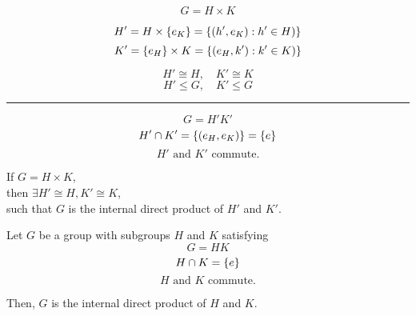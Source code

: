 
\begin{frame}{}
  \[
	G = H \times K
  \]

  \begin{definition}
	\[
	  H' = H \times \left\{e_{K}\right\} = \left\{(h', e_{K}): h' \in H)\right\}
	\]
	\[
	  K' = \left\{e_{H}\right\} \times K = \left\{(e_{H}, k'): k' \in K)\right\}
	\]
  \end{definition}

  \pause
  \[
	H' \cong H, \quad K' \cong K
  \]
  \pause \vspace{-0.50cm}
  \[
	H' \le G, \quad K' \le G
  \]

  \pause
  \vspace{-0.60cm}
  \begin{center}
	\rule{8cm}{0.6pt}
  \end{center}
  \vspace{-0.60cm}

  \[
	G = H'K'
  \]
  \pause \vspace{-0.50cm}
  \[
	H' \cap K' = \left\{(e_{H}, e_{K})\right\} = \left\{e\right\}
  \]
  \pause \vspace{-0.50cm}
  \[
	H' \text{ and } K' \text{ commute}.
  \]
\end{frame}

\begin{frame}{}
  \begin{theorem}
	\begin{center}
	  If $G = H \times K$, \\[5pt]
	  then $\exists H' \cong H, K' \cong K$, \\[5pt]
	  such that $G$ is the internal direct product of $H'$ and $K'$.
	\end{center}
  \end{theorem}

  \pause
  \vspace{0.50cm}
  \begin{definition}
	Let $G$ be a group with subgroups $H$ and $K$ satisfying
	\[
	  G = HK
	\]
	\[
	  H \cap K = \left\{e\right\}
	\]
	\[
	  H \text{ and } K \text{ commute}.
	\]

	Then, $G$ is the internal direct product of $H$ and $K$.
  \end{definition}
\end{frame}

